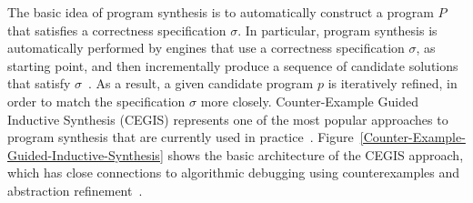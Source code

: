 \documentclass[format=acmsmall, review=false, screen=true]{acmart}
\begin{document}
The basic idea of program synthesis is to automatically construct a program $P$ that satisfies a correctness specification $\sigma$. In particular, program synthesis is automatically performed by engines that use a correctness specification $\sigma$, as starting point, and then incrementally produce a sequence of candidate solutions that satisfy $\sigma$~\cite{Abate17}. As a result, a given candidate program $p$ is iteratively refined, in order to match the specification $\sigma$ more closely. Counter-Example Guided Inductive Synthesis (CEGIS) represents one of the most popular approaches to program synthesis that are currently used in practice~\cite{David15}. Figure~\ref{Counter-Example-Guided-Inductive-Synthesis} shows the basic architecture of the CEGIS approach, which has close connections to algorithmic debugging using counterexamples and abstraction refinement~\cite{Alur13}. 
\end{document}

